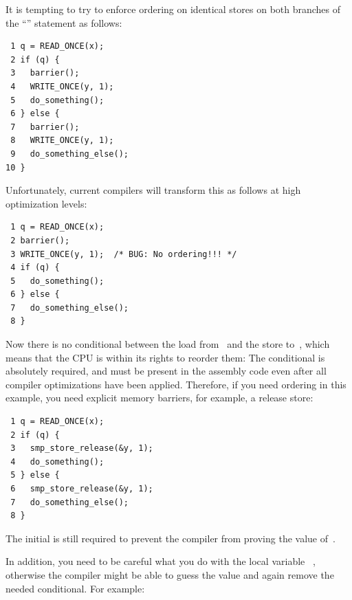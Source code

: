 It is tempting to try to enforce ordering on identical stores on both
branches of the ``'' statement as follows:

\vspace{5pt}
\begin{minipage}[t]{\columnwidth}
\scriptsize
\begin{verbatim}
 1 q = READ_ONCE(x);
 2 if (q) {
 3   barrier();
 4   WRITE_ONCE(y, 1);
 5   do_something();
 6 } else {
 7   barrier();
 8   WRITE_ONCE(y, 1);
 9   do_something_else();
10 }
\end{verbatim}
\end{minipage}
\vspace{5pt}

Unfortunately, current compilers will transform this as follows at high
optimization levels:

\vspace{5pt}
\begin{minipage}[t]{\columnwidth}
\scriptsize
\begin{verbatim}
 1 q = READ_ONCE(x);
 2 barrier();
 3 WRITE_ONCE(y, 1);  /* BUG: No ordering!!! */
 4 if (q) {
 5   do_something();
 6 } else {
 7   do_something_else();
 8 }
\end{verbatim}
\end{minipage}
\vspace{5pt}

Now there is no conditional between the load from~ and the store
to~, which means that the CPU is within its rights to reorder them:
The conditional is absolutely required, and must be present in the
assembly code even after all compiler optimizations have been applied.
Therefore, if you need ordering in this example, you need explicit
memory barriers, for example, a release store:

\vspace{5pt}
\begin{minipage}[t]{\columnwidth}
\scriptsize
\begin{verbatim}
 1 q = READ_ONCE(x);
 2 if (q) {
 3   smp_store_release(&y, 1);
 4   do_something();
 5 } else {
 6   smp_store_release(&y, 1);
 7   do_something_else();
 8 }
\end{verbatim}
\end{minipage}
\vspace{5pt}

The initial  is still required to prevent the compiler from
proving the value of~.

In addition, you need to be careful what you do with the local variable~%
,
otherwise the compiler might be able to guess the value and again remove
the needed conditional.
For example:

